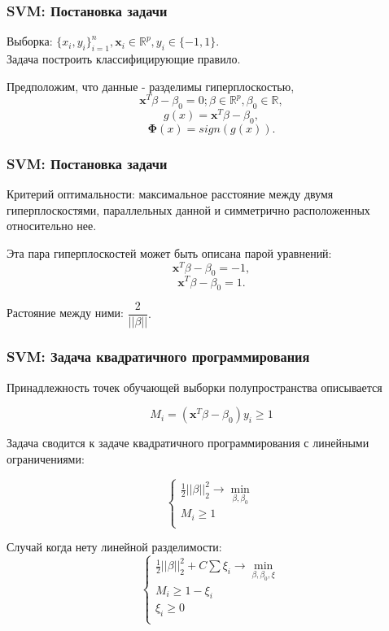 \documentclass[11pt]{beamer}
\begin{document}
	\begin{frame}
		\frametitle{SVM: Постановка задачи}
	
		Выборка: $\{x_i, y_i\}_{i=1}^{n}, \bm{x}_i \in \mathbb{R}^{p}, y_i \in \{-1, 1\}$. \\
		Задача построить классифицирующие правило.\\
		
		\bigskip 
		
		Предположим, что данные - разделимы гиперплоскостью,
		$$ \bm{x}^T\beta - \beta_0 = 0; \beta \in  \mathbb{R}^{p}, \beta_0 \in \mathbb{R},$$
		$$ g(x) =  \bm{x}^T \beta - \beta_0, $$
		$$ \bm{\Phi}(x) =  sign ( g(x) ).$$
	
	\end{frame}

	\begin{frame}
		\frametitle{SVM: Постановка задачи}
		
		Критерий оптимальности: максимальное расстояние между двумя гиперплоскостями, параллельных данной и симметрично расположенных относительно нее.
		
		\bigskip 
		
		Эта пара гиперплоскостей может быть описана парой уравнений:
		$$ \bm{x}^T \beta - \beta_0 = -1, $$
		$$ \bm{x}^T \beta - \beta_0 = 1. $$
		
		\bigskip 
		
		Растояние между ними: $ \dfrac{2}{||\beta||}. $
	\end{frame}

	\begin{frame}
		\frametitle{SVM: Задача квадратичного программирования}
		Принадлежность точек обучающей выборки полупространства описывается
		
		$$ M_i = (\bm{x}^T \beta -  \beta_0) y_i \geqslant 1 $$
		
		Задача сводится к задаче квадратичного программирования с линейными ограничениями:
		
		 $$
			 \begin{cases}
			 	\frac{1}{2}||\beta||_2^2\rightarrow \min\limits_{\beta,\beta_0} \\
			 	M_i  \geqslant 1 \\
			 \end{cases}
		 $$
	
		Случай когда нету линейной разделимости:
		$$
		\begin{cases}
			\frac{1}{2}||\beta||_2^2 + C \sum \xi_i \rightarrow \min\limits_{\beta,\beta_0, \xi} \\
			M_i \geqslant 1 - \xi_i \\
			\xi_i \geqslant 0 \\
		\end{cases}
		$$
	\end{frame}
\end{document}
